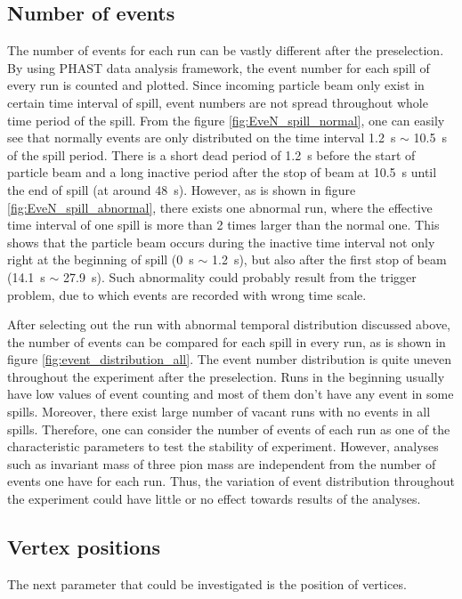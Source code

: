 \subsection{Number of events}
The number of events for each run can be vastly different after the preselection. By using PHAST data analysis framework, the event number for each spill of every run is counted and plotted. Since incoming particle beam only exist in certain time interval of spill, event numbers are not spread throughout whole time period of the spill. From the figure \ref{fig:EveN_spill_normal}, one can easily see that normally events are only distributed on the time interval \SI{1.2}{\second} $\sim$ \SI{10.5}{\second} of the spill period. There is a short dead period of \SI{1.2}{\second} before the start of particle beam and a long inactive period after the stop of beam at \SI{10.5}{\second} until the end of spill (at around \SI{48}{\second}). However, as is shown in figure \ref{fig:EveN_spill_abnormal}, there exists one abnormal run, where the effective time interval of one spill is more than 2 times larger than the normal one. This shows that the particle beam occurs during the inactive time interval not only right at the beginning of spill (\SI{0}{\second} $\sim$ \SI{1.2}{\second}), but also after the first stop of beam (\SI{14.1}{\second} $\sim$ \SI{27.9}{\second}). Such abnormality could probably result from the trigger problem, due to which events are recorded with wrong time scale.

After selecting out the run with abnormal temporal distribution discussed above, the number of events can be compared for each spill in every run, as is shown in figure \ref{fig:event_distribution_all}. The event number distribution is quite uneven throughout the experiment after the preselection. Runs in the beginning usually have low values of event counting and most of them don't have any event in some spills. Moreover, there exist large number of vacant runs with no events in all spills. Therefore, one can consider the number of events of each run as one of the characteristic parameters to test the stability of experiment. However, analyses such as invariant mass of three pion mass are independent from the number of events one have for each run. Thus, the variation of event distribution throughout the experiment could have little or no effect towards results of the analyses.

\subsection{Vertex positions}
The next parameter that could be investigated is the position of vertices.
